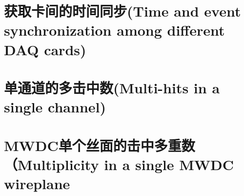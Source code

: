 \section{获取卡间的时间同步(Time and event synchronization among different DAQ cards)}

\section{单通道的多击中数(Multi-hits in a single channel)}

\section{MWDC单个丝面的击中多重数（Multiplicity in a single MWDC wireplane}